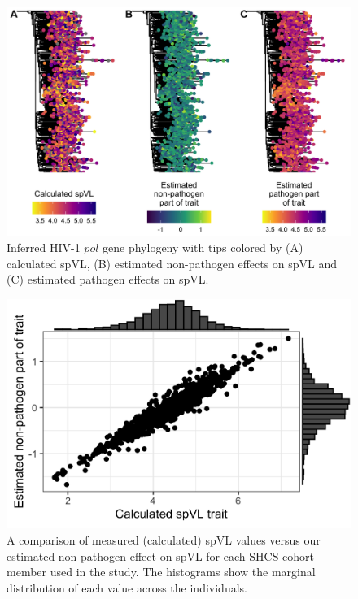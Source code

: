 \documentclass[11pt]{article}
\begin{document}
\begin{doublespace}
\begin{figure}[H]
\begin{center}
\includegraphics[width = \linewidth]{figures/spvl_on_tree.png}
	\caption{Inferred HIV-1 $pol$ gene phylogeny with tips colored by (A) calculated spVL, (B) estimated non-pathogen effects on spVL and (C) estimated pathogen effects on spVL.}
	\label{fig:spvl-on-tree}
	\end{center}
\end{figure}

\begin{figure}[H]
\begin{center}
\includegraphics[width = 0.462\linewidth]{figures/trait_values.png}
	\caption{A comparison of measured (calculated) spVL values versus our estimated non-pathogen effect on spVL for each SHCS cohort member used in the study. The histograms show the marginal distribution of each value across the individuals.}
	\label{fig:trait-comparison}
	\end{center}
\end{figure}


\end{doublespace}
\end{document}
